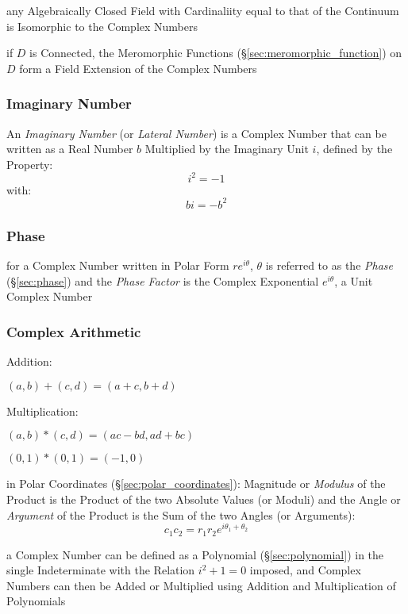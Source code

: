 any Algebraically Closed Field with Cardinaliity equal to that of the Continuum
is Isomorphic to the Complex Numbers

if $D$ is Connected, the Meromorphic Functions
(\S\ref{sec:meromorphic_function}) on $D$ form a Field Extension of the Complex
Numbers



\subsubsection{Imaginary Number}\label{sec:imaginary_number}

An \emph{Imaginary Number} (or \emph{Lateral Number}) is a Complex Number that
can be written as a Real Number $b$ Multiplied by the Imaginary Unit $i$,
defined by the Property:
\[
  i^2 = -1
\]
with:
\[
  bi = -b^2
\]



\subsubsection{Phase}\label{sec:phase_factor}

for a Complex Number written in Polar Form $re^{i\theta}$, $\theta$ is referred
to as the \emph{Phase} (\S\ref{sec:phase}) and the \emph{Phase Factor} is the
Complex Exponential $e^{i\theta}$, a Unit Complex Number



\subsubsection{Complex Arithmetic}\label{sec:complex_arithmetic}

Addition:

$(a,b) + (c,d) = (a + c, b + d)$

Multiplication:

$(a,b)*(c,d) = (ac - bd, ad + bc)$

$(0,1)*(0,1) = (-1, 0)$

in Polar Coordinates (\S\ref{sec:polar_coordinates}): Magnitude or
\emph{Modulus} of the Product is the Product of the two Absolute
Values (or Moduli) and the Angle or \emph{Argument} of the Product is
the Sum of the two Angles (or Arguments):
\[
  c_1 c_2 = r_1 r_2 e^{i\theta_1 + \theta_2}
\]

a Complex Number can be defined as a Polynomial (\S\ref{sec:polynomial}) in the
single Indeterminate with the Relation $i^2 + 1 = 0$ imposed, and Complex
Numbers can then be Added or Multiplied using Addition and Multiplication of
Polynomials



